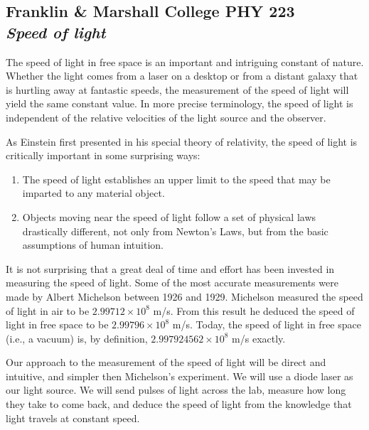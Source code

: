 \documentclass[11pt]{article}
\begin{document}
\begin{center}
\section*{
Franklin \& Marshall College \hfill PHY 223\\
\bigskip
{\Large \it Speed of light}}
\end{center}

The speed of light in free space is an important and intriguing constant of
nature. Whether the light comes from a laser on a desktop or from a distant
galaxy that is hurtling away at fantastic speeds, the measurement of the speed
of light will yield the same constant value. In more precise terminology, the
speed of light is independent of the relative velocities of the light source and
the observer.

As Einstein first presented in his special theory of relativity, the speed of
light is critically important in some surprising ways:\vspace{2mm}

\begin{enumerate}

 \item The speed of light establishes an upper limit to the speed that may be 
 imparted to any material object.
 
 \item Objects moving near the speed of light follow a set of physical laws 
 drastically different, not only from Newton’s Laws, but from the basic 
 assumptions of human intuition.

\end{enumerate}

It is not surprising that a great deal of time and effort has been invested in
measuring the speed of light. Some of the most accurate measurements were made
by Albert Michelson between 1926 and 1929. Michelson measured the speed of light
in air to be $2.99712\times10^8$ m/s. From this result he deduced the speed of light
in free space to be $2.99796\times10^8$ m/s. Today, the speed of light in free space (i.e., a vacuum)
is, by definition, $2.997924562 \times 10^8$ m/s exactly.

Our approach to the measurement of the speed of light will be direct and
intuitive, and simpler then Michelson's experiment. We will use a diode laser as
our light source. We will send pulses of light across the lab, measure how long
they take to come back, and deduce the speed of light from the knowledge that
light travels at constant speed.
\end{document}
